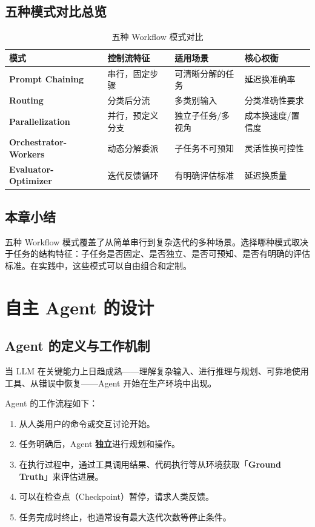 \documentclass[a4paper]{article}
\begin{document}
\subsection{五种模式对比总览}

\begin{table}[H]
\centering
\small
\begin{tabular}{>{\bfseries}p{2.8cm} p{3.2cm} p{3cm} p{3.5cm}}
\toprule
模式 & 控制流特征 & 适用场景 & 核心权衡 \\
\midrule
Prompt Chaining & 串行，固定步骤 & 可清晰分解的任务 & 延迟换准确率 \\
Routing & 分类后分流 & 多类别输入 & 分类准确性要求 \\
Parallelization & 并行，预定义分支 & 独立子任务/多视角 & 成本换速度/置信度 \\
Orchestrator- Workers & 动态分解委派 & 子任务不可预知 & 灵活性换可控性 \\
Evaluator- Optimizer & 迭代反馈循环 & 有明确评估标准 & 延迟换质量 \\
\bottomrule
\end{tabular}
\caption{五种 Workflow 模式对比}
\end{table}

\subsection{本章小结}
五种 Workflow 模式覆盖了从简单串行到复杂迭代的多种场景。选择哪种模式取决于任务的结构特征：子任务是否固定、是否独立、是否可预知、是否有明确的评估标准。在实践中，这些模式可以自由组合和定制。


\section{自主 Agent 的设计}

\subsection{Agent 的定义与工作机制}

当 LLM 在关键能力上日趋成熟——理解复杂输入、进行推理与规划、可靠地使用工具、从错误中恢复——Agent 开始在生产环境中出现。

Agent 的工作流程如下：
\begin{enumerate}
    \item 从人类用户的命令或交互讨论开始。
    \item 任务明确后，Agent \textbf{独立}进行规划和操作。
    \item 在执行过程中，通过工具调用结果、代码执行等从环境获取「\textbf{Ground Truth}」来评估进展。
    \item 可以在检查点（Checkpoint）暂停，请求人类反馈。
    \item 任务完成时终止，也通常设有最大迭代次数等停止条件。
\end{enumerate}
\end{document}
